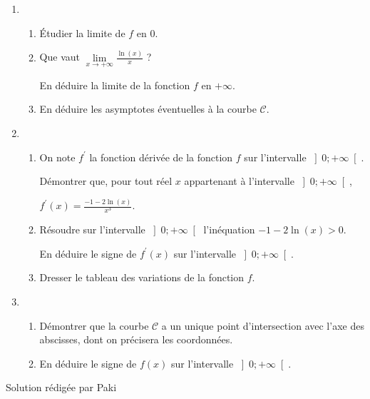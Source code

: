 \begin{enumerate}
     \item
     \begin{enumerate}
          \item
          Étudier la limite de $f$ en $0$.
          \item
          Que vaut $\lim\limits_{x \rightarrow +\infty } \frac{\ln \left(x\right)}{x}$ ?
          \par
          En déduire la limite de la fonction $f$ en $+ \infty $.
          \item
          En déduire les asymptotes éventuelles à la courbe $\mathscr C$.
     \end{enumerate}
     \item
     \begin{enumerate}
          \item
          On note $f^{\prime}$ la fonction dérivée de la fonction $f$ sur l'intervalle $\left]0 ;+\infty \right[$.
          \par
          Démontrer que, pour tout réel $x$ appartenant à l'intervalle $\left]0 ;+\infty \right[$,
          \par
          $f^{\prime}\left(x\right)=\frac{- 1-2\ln \left(x\right)}{x^{3}}.$
          \item
          Résoudre sur l'intervalle $\left]0 ;+\infty \right[$ l'inéquation $-1-2\ln\left(x\right) > 0$.
          \par
          En déduire le signe de $f^{\prime}\left(x\right)$ sur l'intervalle $\left]0 ;+\infty \right[$.
          \item
          Dresser le tableau des variations de la fonction $f$.
     \end{enumerate}
     \item
     \begin{enumerate}
          \item
          Démontrer que la courbe $\mathscr C$ a un unique point d'intersection avec l'axe des abscisses, dont on précisera les coordonnées.
          \item
          En déduire le signe de $f\left(x\right)$ sur l'intervalle $\left]0 ;+\infty \right[$.
     \end{enumerate}
\end{enumerate}
\begin{corrige}
     Solution rédigée par Paki
\begin{center}
\end{center}
\end{corrige}

